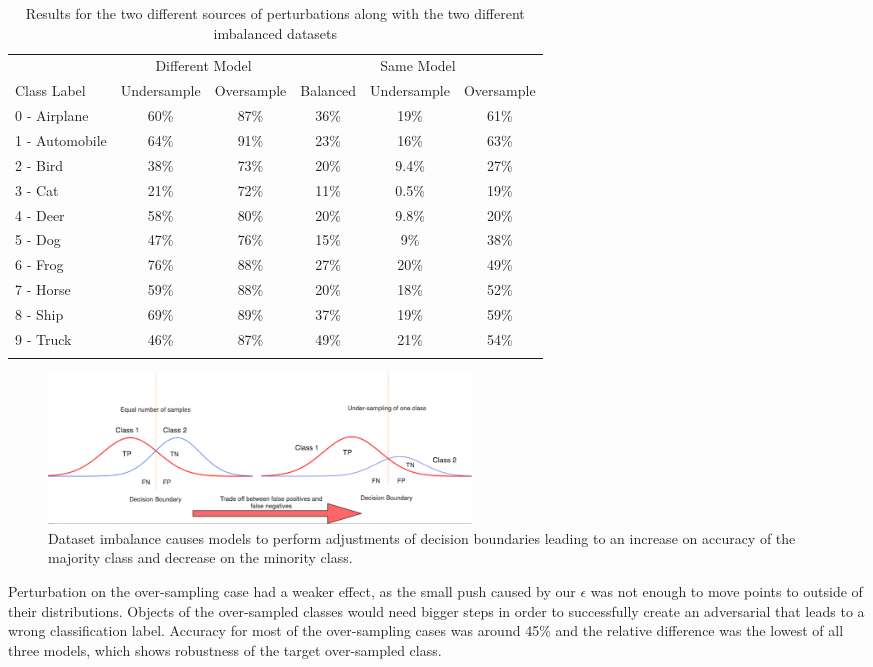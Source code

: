 \documentclass[runningheads,a4paper]{llncs}
\begin{document}
\begin{table}
	\centering
	
	\begin{tabular}{lccccc}
		\toprule
		&\multicolumn{2}{c}{Different Model}
		&\multicolumn{3}{c}{Same Model}
		\\\cmidrule(r){2-3}\cmidrule(l){4-6}
		Class Label &Undersample &Oversample &Balanced &Undersample &Oversample \\
		\midrule
		0 - Airplane &60\%& 87\% &36\%& 19\%    & 61\% \\
		1 - Automobile &64\%& 91\% &23\%& 16\%    & 63\% \\
		2 - Bird &38\%& 73\% &20\%& 9.4\%    & 27\% \\
		3 - Cat &21\%& 72\% &11\%& 0.5\%    & 19\% \\
		4 - Deer &58\%& 80\% &20\%& 9.8\%    & 20\% \\
		5 - Dog &47\%& 76\% &15\%& 9\%    & 38\% \\
		6 - Frog &76\%& 88\% &27\%& 20\%    & 49\% \\
		7 - Horse &59\%& 88\% &20\%& 18\%    & 52\% \\
		8 - Ship &69\%& 89\% &37\%& 19\%    & 59\% \\
		9 - Truck &46\%& 87\% &49\%& 21\%    & 54\% \\
		\bottomrule
		\hfill
	\end{tabular}
	\caption{Results for the two different sources of perturbations along with the two different imbalanced datasets}
	\label{tbl:results}
\end{table}
\begin{figure}
	\centering
	\includegraphics[height=4cm]{class_dist.png}
	\caption{Dataset imbalance causes models to perform adjustments of decision boundaries leading to an increase on accuracy of the majority class and decrease on the minority class.}
	\label{fig:class_dist}
\end{figure}


Perturbation on the over-sampling case had a weaker effect, as the small push caused by our $\epsilon$ was not enough to move points to outside of their distributions. Objects of the over-sampled classes would need bigger steps in order to successfully create an adversarial that leads to a wrong classification label. Accuracy for most of the over-sampling cases was around 45\% and the relative difference was the lowest of all three models, which shows robustness of the target over-sampled class.
\end{document}
